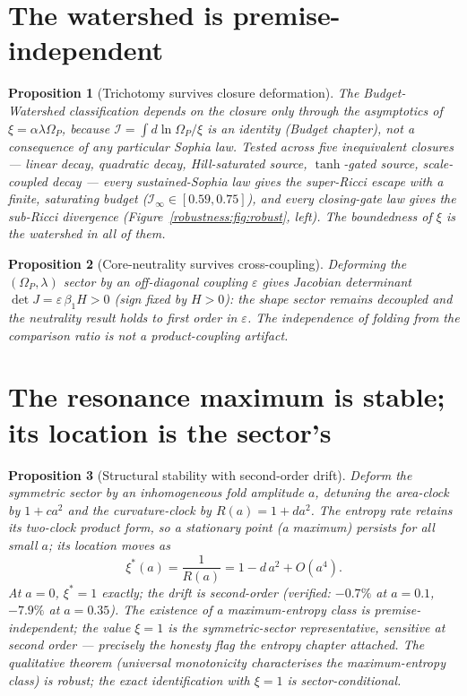 \documentclass[11pt,a4paper,oneside]{book}
\newcommand{\Op}{\Omega_P}
\newcommand{\Ib}{\mathcal I}
\theoremstyle{plain}
\newtheorem{proposition}{Proposition}[chapter]
\theoremstyle{definition}
\theoremstyle{remark}
\begin{document}
\section{The watershed is premise-independent}

\begin{proposition}[Trichotomy survives closure deformation]\label{robustness:prop:wsh}
The Budget-Watershed classification depends on the closure only through the asymptotics of
$\xi=\alpha\lambda\Op$, because $\Ib=\int d\ln\Op/\xi$ is an identity (Budget chapter), not a
consequence of any particular Sophia law. Tested across five inequivalent closures --- linear decay,
quadratic decay, Hill-saturated source, $\tanh$-gated source, scale-coupled decay --- every
sustained-Sophia law gives the super-Ricci escape with a finite, saturating budget
($\Ib_\infty\in[0.59,0.75]$), and every closing-gate law gives the sub-Ricci divergence
(Figure~\ref{robustness:fig:robust}, left). The boundedness of $\xi$ is the watershed in all of them.
\end{proposition}

\begin{proposition}[Core-neutrality survives cross-coupling]\label{robustness:prop:neut}
Deforming the $(\Op,\lambda)$ sector by an off-diagonal coupling $\varepsilon$ gives Jacobian
determinant $\det J=\varepsilon\,\beta_1 H>0$ (sign fixed by $H>0$): the shape sector remains
decoupled and the neutrality result holds to first order in $\varepsilon$. The independence of folding
from the comparison ratio is not a product-coupling artifact.
\end{proposition}

\section{The resonance maximum is stable; its location is the sector's}

\begin{proposition}[Structural stability with second-order drift]\label{robustness:prop:ent}
Deform the symmetric sector by an inhomogeneous fold amplitude $a$, detuning the area-clock by
$1+ca^2$ and the curvature-clock by $R(a)=1+da^2$. The entropy rate retains its two-clock product
form, so a stationary point (a maximum) persists for all small $a$; its location moves as
\begin{equation}
\boxed{\;\xi^{*}(a)=\frac{1}{R(a)}=1-d\,a^{2}+O(a^{4}).\;}
\end{equation}
At $a=0$, $\xi^*=1$ exactly; the drift is second-order (verified: $-0.7\%$ at $a=0.1$, $-7.9\%$ at
$a=0.35$). The \emph{existence} of a maximum-entropy class is premise-independent; the \emph{value}
$\xi=1$ is the symmetric-sector representative, sensitive at second order --- precisely the honesty
flag the entropy chapter attached. The qualitative theorem (universal monotonicity characterises the
maximum-entropy class) is robust; the exact identification with $\xi=1$ is sector-conditional.
\end{proposition}
\end{document}
